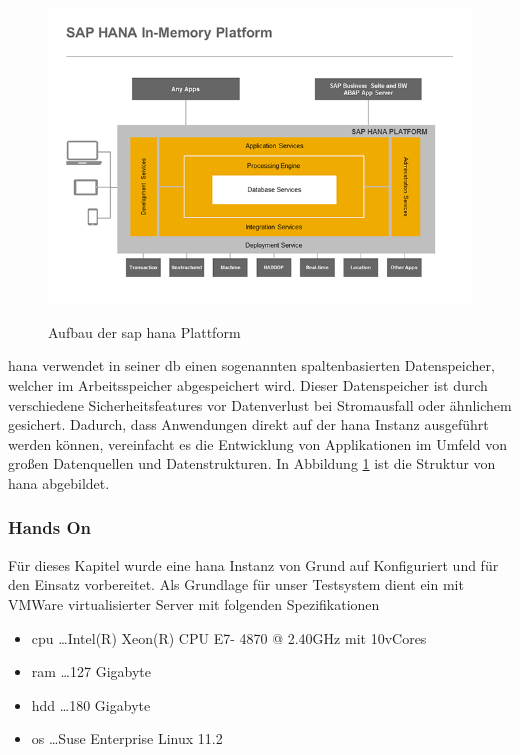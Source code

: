 \begin{figure}[H]
	\begin{center}
	\includegraphics[width=1\linewidth]{grafiken/hana-features-overview.png}
	\vspace{-20pt}
	\caption{Aufbau der \gls{sap} \gls{hana} Plattform \cite{SAPHanaAbout}}
	\vspace{-10pt}
	\label{abb:SAPHanaAbout}
	\end{center}
\end{figure}

\gls{hana} verwendet in seiner \gls{db} einen sogenannten spaltenbasierten Datenspeicher, welcher im Arbeitsspeicher abgespeichert wird. Dieser Datenspeicher ist durch verschiedene Sicherheitsfeatures vor Datenverlust bei Stromausfall oder ähnlichem gesichert.
Dadurch, dass Anwendungen direkt auf der \gls{hana} Instanz ausgeführt werden können, vereinfacht es die Entwicklung von Applikationen im Umfeld von großen Datenquellen und Datenstrukturen. In Abbildung \ref{abb:SAPHanaAbout} ist die Struktur von \gls{hana} abgebildet.

\subsubsection{Hands On}
\label{sec:db-hana-ho}
Für dieses Kapitel wurde eine \gls{hana} Instanz von Grund auf Konfiguriert und für den Einsatz vorbereitet. 
Als Grundlage für unser Testsystem dient ein mit VMWare virtualisierter Server mit folgenden Spezifikationen
\begin{itemize}
	\item \gls{cpu} \ldots Intel(R) Xeon(R) CPU E7- 4870  @ 2.40GHz mit 10vCores
	\item \gls{ram} \ldots 127 Gigabyte
	\item \gls{hdd} \ldots 180 Gigabyte
	\item \gls{os} \ldots Suse Enterprise Linux 11.2	
\end{itemize}

